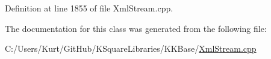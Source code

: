 Definition at line 1855 of file Xml\+Stream.\+cpp.



The documentation for this class was generated from the following file\+:\begin{DoxyCompactItemize}
\item 
C\+:/\+Users/\+Kurt/\+Git\+Hub/\+K\+Square\+Libraries/\+K\+K\+Base/\hyperlink{_xml_stream_8cpp}{Xml\+Stream.\+cpp}\end{DoxyCompactItemize}
